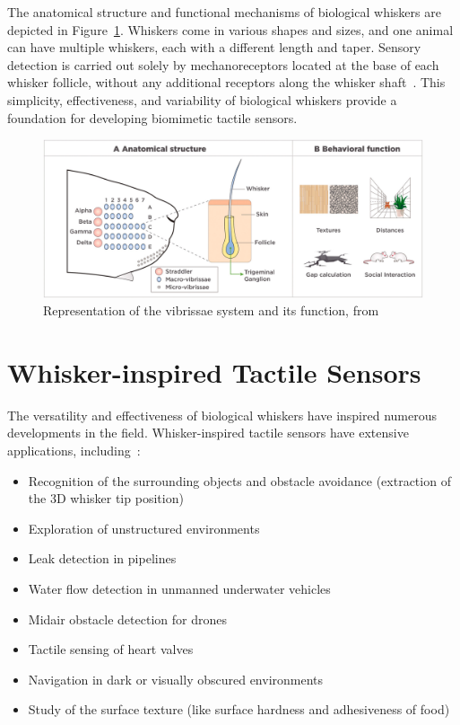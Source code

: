 The anatomical structure and functional mechanisms of biological whiskers are depicted in Figure~\ref{fig:whisker-anatomy}.
Whiskers come in various shapes and sizes, and one animal can have multiple whiskers, each with a different length and taper.
Sensory detection is carried out solely by mechanoreceptors located at the base of each whisker follicle, without any additional receptors along the whisker shaft~\cite{doi:10.1089/soro.2016.0028}.
This simplicity, effectiveness, and variability of biological whiskers provide a foundation for developing biomimetic tactile sensors.

\begin{figure}[htb]
    \centering
    \includegraphics[width=\textwidth]{figures/whisker-anatomy}
    \caption{Representation of the vibrissae system and its function, from~\cite{IBARRACASTANEDA2022100034}}
    \label{fig:whisker-anatomy}
\end{figure}

\pagebreak

\section{Whisker-inspired Tactile Sensors}

The versatility and effectiveness of biological whiskers have inspired numerous developments in the field.
Whisker-inspired tactile sensors have extensive applications, including~\cite{s22072705}:
\begin{itemize}
    \item Recognition of the surrounding objects and obstacle avoidance (extraction of the 3D whisker tip position)
    \item Exploration of unstructured environments
    \item Leak detection in pipelines
    \item Water flow detection in unmanned underwater vehicles
    \item Midair obstacle detection for drones
    \item Tactile sensing of heart valves
    \item Navigation in dark or visually obscured environments
    \item Study of the surface texture (like surface hardness and adhesiveness of food)~\cite{https://doi.org/10.1002/aisy.202300660}
\end{itemize}

